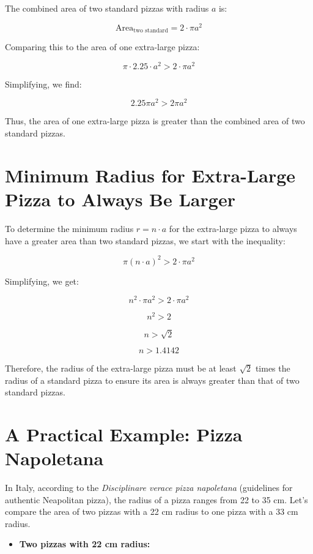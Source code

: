 \documentclass[
  letterpaper,
  DIV=11,
  numbers=noendperiod]{scrartcl}
\providecommand{\tightlist}{%
  \setlength{\itemsep}{0pt}\setlength{\parskip}{0pt}}\usepackage{longtable,booktabs,array}
\begin{document}
The combined area of two standard pizzas with radius \(a\) is:

\[
\text{Area}_{\text{two standard}} = 2 \cdot \pi a^2
\]

Comparing this to the area of one extra-large pizza:

\[
\pi \cdot 2.25 \cdot a^2 > 2 \cdot \pi a^2
\]

Simplifying, we find:

\[
2.25 \pi a^2 > 2 \pi a^2
\]

Thus, the area of one extra-large pizza is greater than the combined
area of two standard pizzas.

\hypertarget{minimum-radius-for-extra-large-pizza-to-always-be-larger}{%
\section{Minimum Radius for Extra-Large Pizza to Always Be
Larger}\label{minimum-radius-for-extra-large-pizza-to-always-be-larger}}

To determine the minimum radius \(r = n \cdot a\) for the extra-large
pizza to always have a greater area than two standard pizzas, we start
with the inequality:

\[
\pi (n \cdot a)^2 > 2 \cdot \pi a^2
\]

Simplifying, we get:

\[
n^2 \cdot \pi a^2 > 2 \cdot \pi a^2
\]

\[
n^2 > 2
\]

\[
n > \sqrt{2}
\]

\[
n > 1.4142
\]

Therefore, the radius of the extra-large pizza must be at least
\(\sqrt{2}\) times the radius of a standard pizza to ensure its area is
always greater than that of two standard pizzas.

\hypertarget{a-practical-example-pizza-napoletana}{%
\section{A Practical Example: Pizza
Napoletana}\label{a-practical-example-pizza-napoletana}}

In Italy, according to the \emph{Disciplinare verace pizza napoletana}
(guidelines for authentic Neapolitan pizza), the radius of a pizza
ranges from 22 to 35 cm. Let's compare the area of two pizzas with a 22
cm radius to one pizza with a 33 cm radius.

\begin{itemize}
\tightlist
\item
  \textbf{Two pizzas with 22 cm radius:}
\end{itemize}
\end{document}
